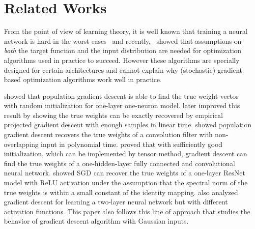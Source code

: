 \documentclass{article}
\begin{document}
\section{Related Works}\label{sec:rel}%
From the point of view of learning theory, it is well known that training a neural network is hard in the worst cases~\citep{blum1989training,livni2014computational,vsima2002training,shalev2017failures,shalev2017weight} and recently,~\citet{shamir2016distribution} showed that assumptions on \emph{both} the target function and the input distribution are needed for optimization algorithms used in practice to succeed.
However these algorithms are specially designed for certain architectures and cannot explain why (stochastic) gradient based optimization algorithms work well in practice.

\citet{tian2017analytical} showed that population gradient descent is able to find the true weight vector with random initialization for one-layer one-neuron model.
\citet{soltanolkotabi2017learning} later improved this result by showing the true weights can be exactly recovered by empirical projected gradient descent with enough samples in linear time.
\citet{brutzkus2017globally} showed population gradient descent recovers the true weights of a convolution filter with non-overlapping input in polynomial time.
\citet{zhong2017recovery,zhong2017learning} proved that with sufficiently good initialization, which can be implemented by tensor method, gradient descent can find the true weights of a one-hidden-layer fully connected and convolutional neural network.
\citet{li2017convergence} showed SGD can recover the true weights of a one-layer ResNet model with ReLU activation under the assumption that the spectral norm of the true weights is within a small constant of the identity mapping.
\cite{panigrahy2018convergence} also analyzed gradient descent for learning a two-layer neural network but with different activation functions.
This paper also follows this line of approach that studies the behavior of gradient descent algorithm with Gaussian inputs.
\end{document}
